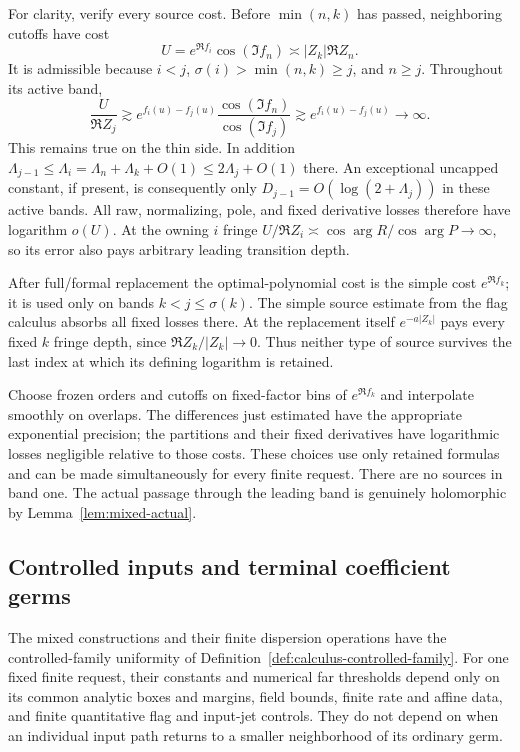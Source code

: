 For clarity, verify every source cost. Before $\min(n,k)$ has
passed, neighboring cutoffs have cost
\[
 U=e^{\Re f_i}\cos(\Im f_n)\asymp |Z_k|\Re Z_n.
\]
It is admissible because $i<j$, $\sigma(i)>\min(n,k)\geq j$,
and $n\geq j$. Throughout its active band,
\begin{equation}\label{eq:mixed-cost-domination}
 \frac{U}{\Re Z_j}\gtrsim
 e^{f_i(u)-f_j(u)}
   \frac{\cos(\Im f_n)}{\cos(\Im f_j)}
 \gtrsim e^{f_i(u)-f_j(u)}\longrightarrow\infty.
\end{equation}
This remains true on the thin side. In addition
$\Lambda_{j-1}\leq\Lambda_i=\Lambda_n+\Lambda_k+O(1)
\leq2\Lambda_j+O(1)$ there. An exceptional uncapped constant,
if present, is consequently only
$D_{j-1}=O(\log(2+\Lambda_j))$ in these active bands. All raw,
normalizing, pole, and fixed derivative losses therefore have
logarithm $o(U)$. At the owning $i$ fringe
$U/\Re Z_i\asymp\cos\arg R/\cos\arg P\to\infty$,
so its error also pays arbitrary leading transition depth.

After full/formal replacement the optimal-polynomial cost is
the simple cost $e^{\Re f_k}$; it is used only on bands
$k<j\leq\sigma(k)$. The simple source estimate from the flag
calculus absorbs all fixed losses there. At the replacement
itself $e^{-a|Z_k|}$ pays every fixed $k$ fringe depth, since
$\Re Z_k/|Z_k|\to0$. Thus neither type of source survives the
last index at which its defining logarithm is retained.

Choose frozen orders and cutoffs on fixed-factor bins of
$e^{\Re f_k}$ and interpolate smoothly on overlaps. The
differences just estimated have the appropriate exponential
precision; the partitions and their fixed derivatives have
logarithmic losses negligible relative to those costs. These
choices use only retained formulas and can be made simultaneously
for every finite request. There are no sources in band one.
The actual passage through the leading band is genuinely
holomorphic by Lemma~\ref{lem:mixed-actual}.

\subsection{Controlled inputs and terminal coefficient germs}

\begin{lemma}
\label{lem:mixed-controlled-uniformity}
The mixed constructions and their finite dispersion operations have
the controlled-family uniformity of
Definition~\ref{def:calculus-controlled-family}. For one fixed finite
request, their constants and numerical far thresholds depend only
on its common analytic boxes and margins, field bounds, finite
rate and affine data, and finite quantitative flag and input-jet
controls. They do not depend on when an individual input path
returns to a smaller neighborhood of its ordinary germ.
\end{lemma}

